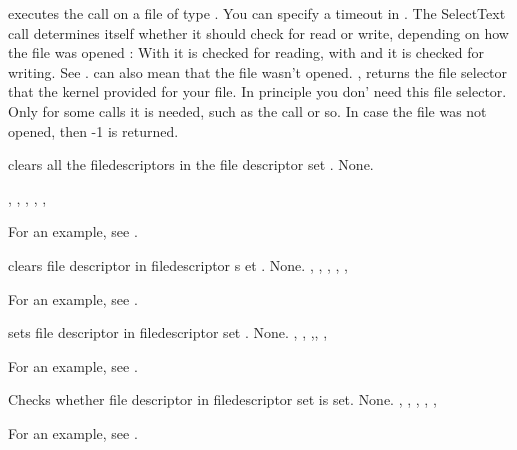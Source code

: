 

{ executes the  call on a file of type
. You can specify a timeout in . The SelectText call
determines itself whether it should check for read or write, depending on
how the file was opened : With  it is checked for reading, with
 and  it is checked for writing.}
{See .  can also mean that the file wasn't
opened.}
{, }
{ returns the file selector that the kernel provided for your
file. In principle you don' need this file selector. Only for some calls
it is needed, such as the  call or so.}
{In case the file was not opened, then -1 is returned.}
{}



{ clears all the filedescriptors in the file descriptor 
set .}
{None.}
{, 
, 
, 
,
, 

}

For an example, see .

{  clears file descriptor  in filedescriptor s
  et .}
{None.}
{, 
, 
,
, 
, 
}

For an example, see .

{ sets file descriptor  in filedescriptor set .}
{None.}
{, , ,, 
, }

For an example, see .

{ Checks whether file descriptor  in filedescriptor set 
is set.}
{None.}
{, , ,
, 
,
}

For an example, see .

